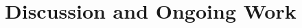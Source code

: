 \documentclass{sig-alternate}
\begin{document}
 
 
 
 
 
 
 
 
 
% 
 
\section{Discussion and Ongoing Work} \label{S:conclusion}
 
\end{document}
